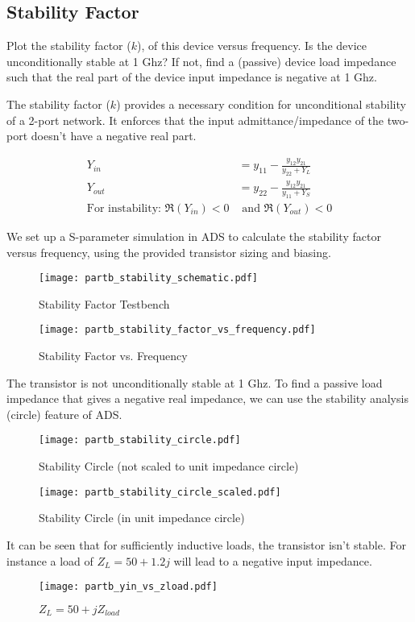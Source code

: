 \subsection{Stability Factor}
{\color{blue}Plot the stability factor ($k$), of this device versus frequency.
Is the device unconditionally stable at 1 Ghz?
If not, find a (passive) device load impedance such that the real part of the device
input impedance is negative at 1 Ghz.}

The stability factor ($k$) provides a necessary condition for unconditional stability of a 2-port network. It enforces that the input admittance/impedance of the two-port doesn't have a negative real part.

\begin{align*}
    Y_{in} &= y_{11} - \frac{y_{12}y_{21}}{y_{22} + Y_L} \\
    Y_{out} &= y_{22} - \frac{y_{12}y_{21}}{y_{11} + Y_S} \\
    \text{For instability: } \Re({Y_{in}}) < 0 &\text{ and } \Re(Y_{out}) < 0
\end{align*}

We set up a S-parameter simulation in ADS to calculate the stability factor versus frequency, using the provided transistor sizing and biasing.

\begin{figure}[H]
    \texttt{[image: partb\_stability\_schematic.pdf]}
    \caption{Stability Factor Testbench}
    \endminipage\hfill
    \texttt{[image: partb\_stability\_factor\_vs\_frequency.pdf]}
    \caption{Stability Factor vs. Frequency}
    \endminipage
\end{figure}

The transistor is not unconditionally stable at 1 Ghz. To find a passive load impedance that gives a negative real impedance, we can use the stability analysis (circle) feature of ADS.

\begin{figure}[H]
    \texttt{[image: partb\_stability\_circle.pdf]}
    \caption{Stability Circle (not scaled to unit impedance circle)}
    \endminipage\hfill
    \texttt{[image: partb\_stability\_circle\_scaled.pdf]}
    \caption{Stability Circle (in unit impedance circle)}
    \endminipage
\end{figure}

It can be seen that for sufficiently inductive loads, the transistor isn't stable. For instance a load of $Z_L = 50 + 1.2j$ will lead to a negative input impedance.
\begin{figure}[H]
    \centering \texttt{[image: partb\_yin\_vs\_zload.pdf]}
    \caption{$Z_L = 50 + j Z_{load}$}
\end{figure}


